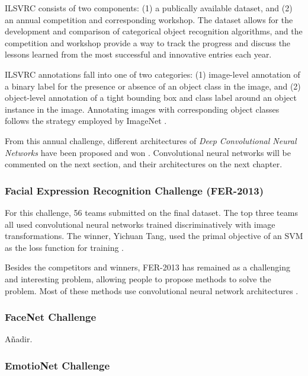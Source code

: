 ILSVRC consists of two components: (1) a publically available dataset, and
(2) an annual competition and corresponding workshop. The dataset allows
for the development and comparison of categorical object recognition
algorithms, and the competition and workshop provide a way to track the
progress and discuss the lessons learned from the most successful and
innovative entries each year.

ILSVRC annotations fall into one of two categories: (1) image-level
annotation of a binary label for the presence or absence of an object
class in the image, and (2) object-level annotation of a tight bounding
box and class label around an object instance in the image. Annotating
images with corresponding object classes follows the strategy employed
by ImageNet \citep{Deng2009}.

From this annual challenge, different architectures of \textit{Deep
Convolutional Neural Networks} have been proposed and won \citep{Hinton2012,
Krizhevsky2012, Simonyan2014, Szegedy2014, Russakovsky2014}. Convolutional
neural networks will be commented on the next section, and their
architectures on the next chapter.


\subsubsection{Facial Expression Recognition Challenge (FER-2013)}

For this challenge, 56 teams submitted on the final dataset. The top
three teams all used convolutional neural networks \citep{Fukushima1982}
trained discriminatively with image transformations.
The winner, Yichuan Tang, used the primal objective of an SVM as the
loss function for training \citep{Goodfellow2013}.

Besides the competitors and winners, FER-2013 has remained as a
challenging and interesting problem, allowing people to propose
methods to solve the problem. Most of these methods use convolutional
neural network architectures \citep{Mollahosseini2015}.


\subsubsection{FaceNet Challenge}

{\color{JungleGreen} Añadir.}
\citep{Schroff2015}


\subsubsection{EmotioNet Challenge}

